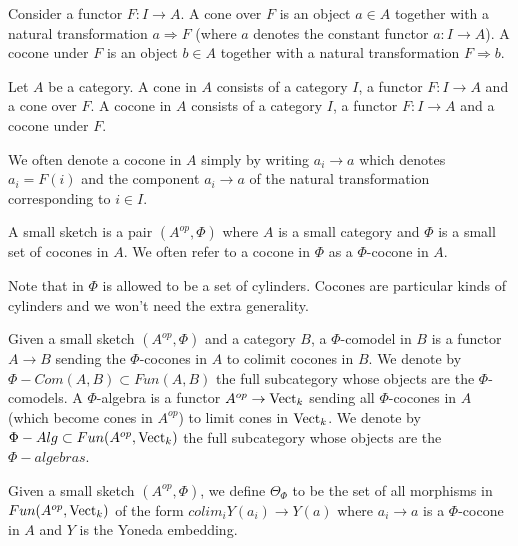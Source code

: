 \begin{definition}

Consider a functor $F:I\to A$. A cone over $F$ is an object $a\in A$ together with a natural transformation $a\Rightarrow F$ (where $a$ denotes the constant functor $a:I\to A$). A cocone under $F$ is an object $b\in A$ together with a natural transformation $F\Rightarrow b$.\end{definition}

\begin{definition}

Let $A$ be a category. A cone in $A$ consists of a category $I$, a functor $F:I\to A$ and a cone over $F$. A cocone in $A$ consists of a category $I$, a functor $F:I\to A$ and a cocone under $F$.\end{definition}

We often denote a cocone in $A$ simply by writing $a_i\to a$ which denotes $a_i=F(i)$ and the component $a_i\to a$ of the natural transformation corresponding to $i\in I$.


\begin{definition}
A small sketch is a pair $(A^{op},\Phi)$ where $A$ is a small category and $\Phi$ is a small set of cocones in $A$. We often refer to a cocone in $\Phi$ as a $\Phi$-cocone in $A$.\end{definition}

\begin{remark}Note that in \cite{kelly/basic-concepts-enriched} $\Phi$ is allowed to be a set of cylinders. Cocones are particular kinds of cylinders and we won't need the extra generality.\end{remark}

\begin{definition}
Given a small sketch $(A^{op},\Phi)$ and a category $B$, a $\Phi$-comodel in $B$ is a functor $A\to B$ sending the $\Phi$-cocones in $A$ to colimit cocones in $B$. We denote by $\Phi-Com(A,B)\subset Fun(A,B)$ the full subcategory whose objects are the $\Phi$-comodels. A $\Phi$-algebra is a functor $A^{op}\to \operatorname{Vect}_k$ sending all $\Phi$-cocones in $A$ (which become cones in $A^{op}$) to limit cones in $\operatorname{Vect}_k$. We denote by $\Phi-Alg\subset Fun(A^{op},\operatorname{Vect}_k)$ the full subcategory whose objects are the $\Phi-algebras$.
\end{definition}


\begin{definition}

Given a small sketch $(A^{op},\Phi)$, we define $\Theta_{\Phi}$ to be the set of all morphisms in $Fun(A^{op},\operatorname{Vect}_k)$ of the form $colim_i Y(a_i)\to Y(a)$ where $a_i\to a$ is a $\Phi$-cocone in $A$ and $Y$ is the Yoneda embedding.\end{definition}


